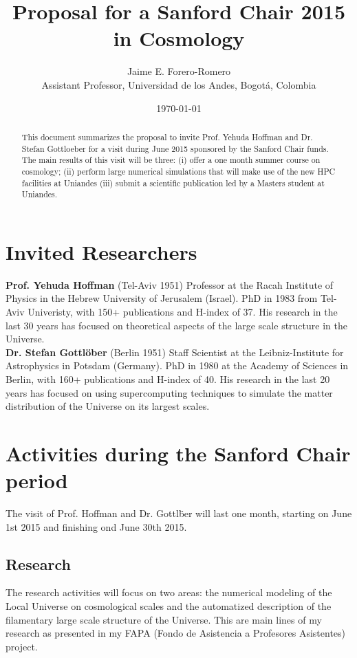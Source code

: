 \documentclass[12pt]{article}
\title{Proposal for a Sanford Chair 2015 in Cosmology}
\author{Jaime E. Forero-Romero\\{\small Assistant Professor, Universidad de los Andes, Bogot\'a, Colombia}}
\date{\today}
\begin{document}
\maketitle

\begin{abstract}
This document summarizes the proposal to invite Prof. Yehuda Hoffman
and Dr. Stefan Gottloeber for a visit during June 2015 sponsored by the
Sanford Chair funds. The main results of this visit will be three: 
(i) offer a one month summer course on cosmology; (ii) perform large numerical
simulations that will make use of the new HPC facilities at Uniandes
(iii) submit a scientific publication led by a Masters student at
Uniandes.  
\end{abstract}


\section{Invited Researchers}


\noindent
{\bf Prof. Yehuda Hoffman} (Tel-Aviv 1951) Professor at the Racah
Institute of Physics in the Hebrew University of Jerusalem
(Israel). PhD in 1983 from Tel-Aviv Univeristy, with 150+ publications
and H-index of 37. His research in the last 30 years has focused on
theoretical aspects of the large scale structure in the Universe. \\

\noindent
{\bf Dr. Stefan Gottl\"ober} (Berlin 1951) Staff Scientist at the
Leibniz-Institute for Astrophysics in Potsdam (Germany). PhD in 1980
at the Academy of Sciences in Berlin, with 160+ publications and
H-index of 40. His research in the last 20 years has focused on using
supercomputing techniques  to simulate the matter distribution of the
Universe on its largest scales. 

\section{Activities during the Sanford Chair period}

The visit of Prof. Hoffman and Dr. Gottl\"ber will last one
month, starting on June 1st 2015 and finishing ond June 30th 2015. 

\subsection{Research}

The research activities will focus on two areas: the 
numerical modeling of the Local Universe on cosmological scales and
the automatized description of the filamentary large scale structure of the
Universe. This are main lines of my research as presented in my FAPA
(Fondo de Asistencia a Profesores Asistentes) project. 
\end{document}
